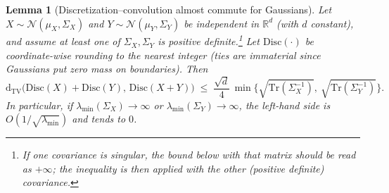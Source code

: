 \documentclass[10pt]{article} %
\theoremstyle{plain}
\newtheorem{lemma}[theorem]{Lemma}
\newcommand{\dtv}{\mathrm{d_{TV}}}
\newcommand{\disc}{\mathrm{Disc}}
\begin{document}
\begin{lemma}[Discretization--convolution almost commute for Gaussians]
\label{lem:disc-conv-commute-gauss}
Let $X\sim\mathcal{N}(\mu_X,\Sigma_X)$ and $Y\sim\mathcal{N}(\mu_Y,\Sigma_Y)$ be independent in $\mathbb{R}^d$ (with $d$ constant), and assume at least one of $\Sigma_X,\Sigma_Y$ is positive definite.\footnote{If one covariance is singular, the bound below with that matrix should be read as $+\infty$; the inequality is then applied with the other (positive definite) covariance.} Let $\disc(\cdot)$ be coordinate-wise rounding to the nearest integer (ties are immaterial since Gaussians put zero mass on boundaries). Then
\[
\dtv\!\big(\disc(X)+\disc(Y),\,\disc(X+Y)\big)
\;\le\; \frac{\sqrt{d}}{4}\,
\min\!\Big\{\sqrt{\mathrm{Tr}(\Sigma_X^{-1})},\ \sqrt{\mathrm{Tr}(\Sigma_Y^{-1})}\Big\}.
\]
In particular, if $\lambda_{\min}(\Sigma_X)\to\infty$ or $\lambda_{\min}(\Sigma_Y)\to\infty$, the left-hand side is $O(1/\sqrt{\lambda_{\min}})$ and tends to $0$.
\end{lemma}
\end{document}
